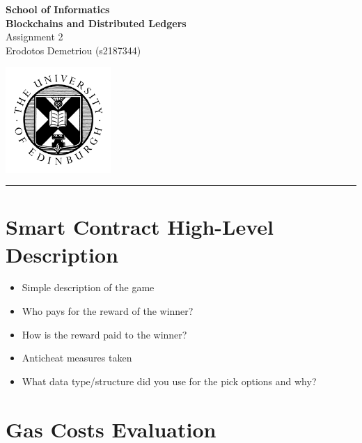 \documentclass[12pt,a4paper]{article}
\begin{document}
\noindent
\begin{minipage}{120mm}
        {\huge {\bf School of Informatics}}\\
        {\Large {\bf Blockchains and Distributed Ledgers}}\\

        {\Large Assignment 2}\\
        {\normalsize Erodotos Demetriou (s2187344)}
\end{minipage}
\hfill
\begin{minipage}{40mm}              
        \includegraphics[width=40mm]{crest.png}
\end{minipage}

\begin{center}
\rule{\linewidth}{0.5mm}
\end{center}

\section*{Smart Contract High-Level Description}
\begin{itemize}
        \item Simple description of the game
        \item Who pays for the reward of the winner?
        \item How is the reward paid to the winner?
        \item Anticheat measures taken
        \item What data type/structure did you use for the pick options and why?
\end{itemize}

\section*{Gas Costs Evaluation}
\end{document}
